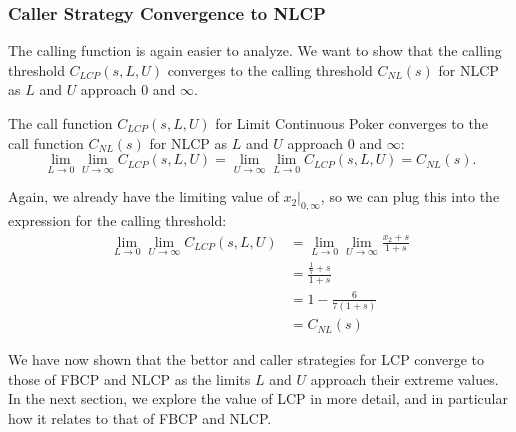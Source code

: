 \documentclass[../../main/main.tex]{subfiles}
\begin{document}
\subsubsection{Caller Strategy Convergence to NLCP}

The calling function is again easier to analyze. We want to show that the calling threshold $C_{LCP}(s, L, U)$ converges to the calling threshold $C_{NL}(s)$ for NLCP as $L$ and $U$ approach $0$ and $\infty$.
\begin{theorem}
    The call function $C_{LCP}(s, L, U)$ for Limit Continuous Poker converges to the call function $C_{NL}(s)$ for NLCP as $L$ and $U$ approach $0$ and $\infty$:
\[
\lim_{L \to 0} \lim_{U \to \infty} C_{LCP}(s, L, U) = \lim_{U \to \infty} \lim_{L \to 0} C_{LCP}(s, L, U) = C_{NL}(s).
\]
\end{theorem}
\begin{customproof}
Again, we already have the limiting value of $x_2|_{0,\infty}$, so we can plug this into the expression for the calling threshold:
\begin{align*}
    \lim_{L \to 0} \lim_{U \to \infty} C_{LCP}(s, L, U) & = \lim_{L \to 0} \lim_{U \to \infty} \frac{x_2+s}{1+s}\\
    & = \frac{\frac{1}{7}+s}{1+s}\\
    & = 1 - \frac{6}{7(1+s)}\\
    & = C_{NL}(s)
\end{align*}
\end{customproof}

We have now shown that the bettor and caller strategies for LCP converge to those of FBCP and NLCP as the limits $L$ and $U$ approach their extreme values. In the next section, we explore the value of LCP in more detail, and in particular how it relates to that of FBCP and NLCP.
\end{document}
